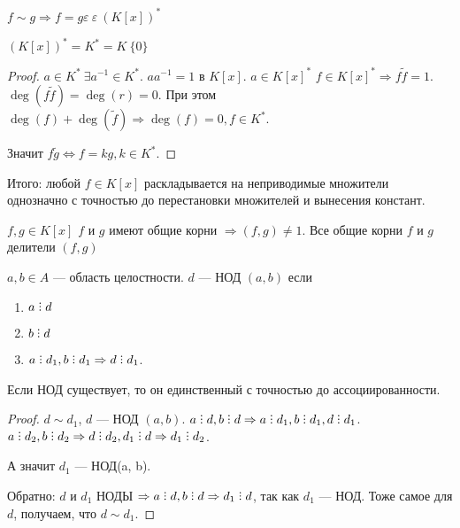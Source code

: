 $f \sim g \Rightarrow f = g\varepsilon\ \varepsilon\ (K[x])^*$
 \begin{lemma}
     $(K[x])^* = K^* = K \ \{0\}$
\end{lemma}
\begin{proof}
    $a \in K^*\ \exists a^{-1} \in K^*$.  $a a^{-1} = 1$ в  $K[x]$.  $a \in K[x]^*$ $f \in K[x]^* \Rightarrow f \widetilde{f} = 1$.  $\deg (f \widetilde{f}) = \deg(r) = 0$. При этом  $\deg (f) + \deg(\widetilde{f}) \Rightarrow \deg(f) = 0, f \in K^*$.

    Значит $f \widetilde g \iff f = kg, k \in K^*$.
\end{proof}
\slashn
Итого: любой $f \in K[x]$ раскладывается на неприводимые множители однозначно с точностью до перестановки множителей и вынесения констант.
 \begin{consequence}
     $f, g \in K[x]$  $f$ и  $g$ имеют общие корни  $\Rightarrow (f, g) \neq 1$. Все общие корни  $f$ и  $g$ делители  $(f, g)$
\end{consequence}
\begin{definition}
    $a, b \in A$ --- область целостности.  $d$ --- НОД $(a, b)$ если
    \begin{enumerate}
        \item $a \divby d$
        \item  $b \divby d$
        \item  $a \divby d_1, b \divby d_1 \Rightarrow d \divby d_1$.
    \end{enumerate}
\end{definition}
\begin{statement}
    Если НОД существует, то он единственный с точностью до ассоциированности.
\end{statement}
\begin{proof}
    $d \sim d_1$,  $d$ --- НОД $(a,b)$.  $a \divby d, b \divby d \Rightarrow a \divby d_1, b \divby d_1, d \divby d_1$. $a \divby d_2, b \divby d_2 \Rightarrow d  \divby d_2, d_1 \divby d \Rightarrow d_1 \divby d_2$. 

    А значит $d_1$ --- НОД(a, b).

    Обратно: $d$ и $d_1$ НОДЫ $\Rightarrow a \divby d, b \divby d \Rightarrow d_1 \divby d$, так как  $d_1$ --- НОД. Тоже самое для $d$, получаем, что  $d \sim d_1$.
\end{proof}

